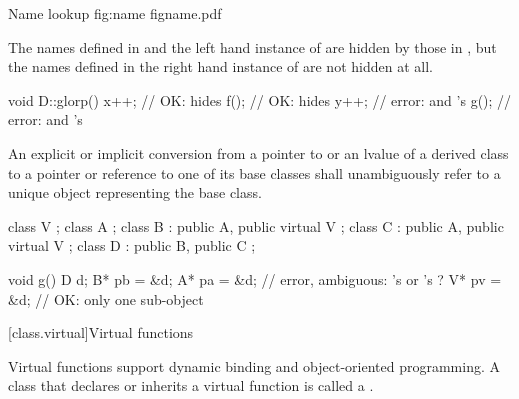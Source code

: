 \begin{importgraphic}
{Name lookup}
{fig:name}
{figname.pdf}
\end{importgraphic}

The names defined in  and the left hand instance of 
are hidden by those in , but the names defined in the
right hand instance of  are not hidden at all.
\begin{codeblock}
void D::glorp()
{
    x++;			// OK:  hides 
    f();			// OK:  hides 
    y++;			// error:  and 's 
    g();			// error:  and 's 
}
\end{codeblock}
\exitexampleb
{}%

\pnum
An explicit or implicit conversion from a pointer to or an lvalue of a
derived class to a pointer or reference to one of its base classes shall
unambiguously refer to a unique object representing the base class.
\enterexample
\begin{codeblock}
class V { };
class A { };
class B : public A, public virtual V { };
class C : public A, public virtual V { };
class D : public B, public C { };

void g()
{
    D d;
    B* pb = &d;
    A* pa = &d;			// error, ambiguous: 's  or 's ?
    V* pv = &d;			// OK: only one  sub-object
}
\end{codeblock}
\exitexampleb

[class.virtual]{Virtual functions}%
%
%

\pnum
Virtual functions support dynamic binding and object-oriented
programming. A class that declares or inherits a virtual function is
called a .

